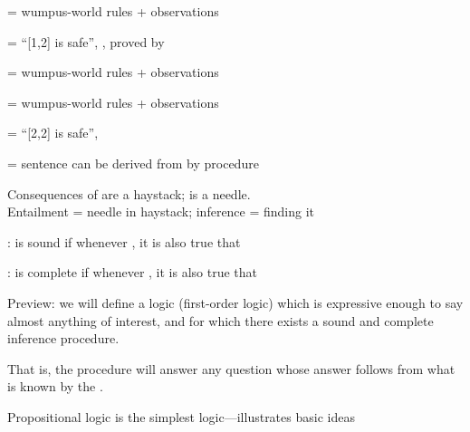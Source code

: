 \documentclass{article}
\begin{document}
\begin{huge}
\textwidth
{}

 = wumpus-world rules + observations

 = ``[1,2] is safe'', , proved by 



\textwidth
{}

 = wumpus-world rules + observations


\textwidth
{}

 = wumpus-world rules + observations

 = ``[2,2] is safe'', 




 = sentence \mat{$\alpha$} can be derived from  by procedure 

Consequences of  are a haystack; \mat{$\alpha$} is a needle.\\
Entailment = needle in haystack; inference = finding it

:  is sound if\nl
whenever , it is also true that 

:  is complete if\nl
whenever , it is also true that 

Preview: we will define a logic (first-order logic) which is
expressive enough to say almost anything of interest, and for which
there exists a sound and complete inference procedure.

That is, the procedure will answer any question whose answer follows
from what is known by the .




Propositional logic is the simplest logic---illustrates basic ideas


\end{huge}
\end{document}
